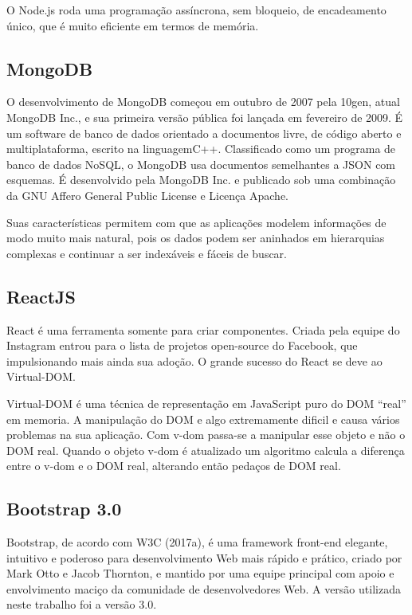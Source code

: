 \documentclass{automatextcc}
\begin{document}
O Node.js roda uma programação assíncrona, sem bloqueio, de encadeamento único, que é muito eficiente em termos de memória.


\subsection{MongoDB}

O desenvolvimento de MongoDB começou em outubro de 2007 pela 10gen, atual MongoDB Inc., e sua primeira versão pública foi lançada em fevereiro de 2009.  É um software de banco de dados orientado a documentos livre, de código aberto e multiplataforma, escrito na linguagemC++. Classificado como um programa de banco de dados NoSQL, o MongoDB usa documentos semelhantes a JSON com esquemas. É desenvolvido pela MongoDB Inc. e publicado sob uma combinação da GNU Affero General Public License e Licença Apache.

Suas características permitem com que as aplicações modelem informações de modo muito mais natural, pois os dados podem ser aninhados em hierarquias complexas e continuar a ser indexáveis e fáceis de buscar.


\subsection{ReactJS}

React é uma ferramenta somente para criar componentes. Criada pela equipe do Instagram entrou para o lista de projetos open-source do Facebook, que  impulsionando mais ainda sua adoção. O grande sucesso do React se deve ao Virtual-DOM.

Virtual-DOM é uma técnica de representação em JavaScript puro do DOM “real” em memoria. A manipulação do DOM e algo extremamente dificil e causa vários problemas na sua aplicação. Com v-dom passa-se a manipular esse objeto e não o DOM real. Quando o objeto v-dom é atualizado um algoritmo calcula a diferença entre o v-dom e o DOM real, alterando então pedaços de DOM real.

\subsection{ Bootstrap 3.0}

Bootstrap, de acordo com W3C (2017a), é uma framework front-end elegante, intuitivo e poderoso para desenvolvimento Web mais rápido e prático, criado por Mark Otto e Jacob Thornton, e mantido por uma equipe principal com apoio e envolvimento maciço da comunidade de desenvolvedores Web. A versão utilizada neste trabalho foi a versão 3.0.
\end{document}

